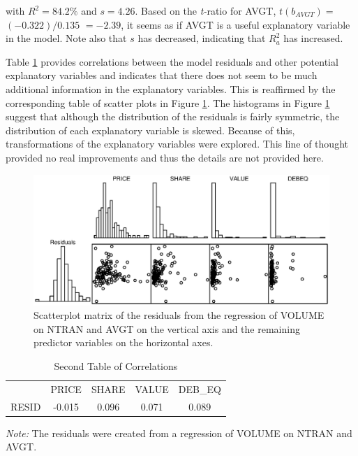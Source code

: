 \noindent with $R^2=84.2\%$ and $s=4.26$. Based on the
\textit{t-}ratio for AVGT, $t(b_{AVGT})=$ $(-0.322)/0.135$ $=-2.39$,
it seems as if AVGT is a useful explanatory variable in the model.
Note also that $s$ has decreased, indicating that $R_a^2$ has
increased.

Table \ref{T5:LiquidResidCorr2} provides correlations between the
model residuals and other potential explanatory variables and
indicates that there does not seem to be much additional information
in the explanatory variables. This is reaffirmed by the
corresponding table of scatter plots in Figure
\ref{F5:LiquidResidPlot}. The histograms in Figure
\ref{F5:LiquidResidPlot} suggest that although the distribution of
the residuals is fairly symmetric, the distribution of each
explanatory variable is skewed. Because of this, transformations of
the explanatory variables were explored. This line of thought
provided no real improvements and thus the details are not provided
here.

\begin{figure}[htp]
  \begin{center}
    \includegraphics[width=1\textwidth]{Chapter5/F5LiquidResidPlot.eps}
    \caption{\label{F5:LiquidResidPlot} \small  Scatterplot matrix of the
residuals from the regression of VOLUME on NTRAN and AVGT on the
vertical axis and the remaining predictor variables on the
horizontal axes.}
  \end{center}
\end{figure}



\begin{table}[h]

\caption{\label{T5:LiquidResidCorr2} Second Table of Correlations }
\begin{tabular}{ccccc}
\hline
& PRICE & SHARE & VALUE & DEB\_EQ \\
RESID & -0.015 & 0.096 & 0.071 & 0.089 \\ \hline
\end{tabular}

{\small \textit{Note:} The residuals were created from a regression
of VOLUME on NTRAN and AVGT.}  
\end{table}

